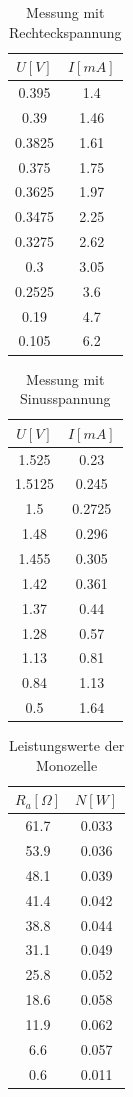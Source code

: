 \documentclass[11pt]{article}
\begin{document}
 
 \begin{table}[h]
 \centering

 \begin{tabular}{|c|c|}
  \hline
  $U[V]$ & $I[mA]$  \\
  \hline
  0.395 & 1.4 \\
  0.39 & 1.46 \\
  0.3825& 1.61 \\
  0.375 & 1.75 \\
  0.3625 & 1.97\\
  0.3475 & 2.25\\
  0.3275 & 2.62 \\
  0.3 & 3.05\\
  0.2525 & 3.6\\
  0.19 & 4.7\\
  0.105 & 6.2\\
  \hline
 \end{tabular}
  \caption{Messung mit Rechteckspannung}
 \label{Messung 3}
 \end{table}
 
 
 \begin{table}[h]
 \centering

 \begin{tabular}{|c|c|}
  \hline
  $U[V]$ & $I[mA]$  \\
  \hline
  1.525 & 0.23 \\
  1.5125 & 0.245 \\
  1.5& 0.2725 \\
  1.48 & 0.296 \\
  1.455 & 0.305\\
  1.42& 0.361\\
  1.37 & 0.44 \\
  1.28 & 0.57\\
  1.13 & 0.81\\
  0.84 & 1.13\\
  0.5 & 1.64\\
  \hline
 \end{tabular}
  \caption{Messung mit Sinusspannung}
 \label{Messung 4}
 \end{table}
 
 \begin{table}
 \centering
 \begin{tabular}{|c|c|}
\hline
$R_a [\Omega]$ & $N [W]$ \\
\hline
61.7 & 0.033\\
53.9 & 0.036\\
48.1 & 0.039\\
41.4 & 0.042\\
38.8 & 0.044\\
31.1 & 0.049\\
25.8 & 0.052\\
18.6 & 0.058\\
11.9 & 0.062\\
6.6 & 0.057\\
0.6 & 0.011\\
\hline
\end{tabular}
\caption{Leistungswerte der Monozelle}
\label{leistung}
\end{table}
\end{document}
